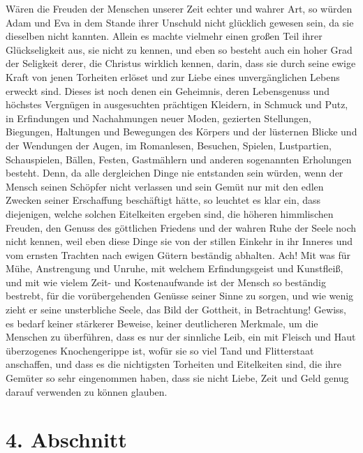 Wären die Freuden der Menschen unserer Zeit echter und wahrer Art, so würden
Adam und Eva in dem Stande ihrer
Unschuld nicht glücklich gewesen sein, da sie
dieselben nicht kannten. Allein es machte vielmehr einen großen Teil ihrer
Glückseligkeit aus, sie nicht zu kennen, und eben so besteht auch ein hoher
Grad der Seligkeit derer, die Christus wirklich kennen, darin, dass sie durch
seine ewige Kraft von jenen Torheiten erlöset und zur Liebe eines
unvergänglichen Lebens erweckt sind. Dieses ist noch denen ein Geheimnis, deren
Lebensgenuss und höchstes Vergnügen in ausgesuchten prächtigen Kleidern, in
Schmuck und Putz, in Erfindungen und
Nachahmungen neuer Moden, gezierten
Stellungen, Biegungen, Haltungen und Bewegungen des Körpers und der lüsternen
Blicke und der Wendungen der Augen, im Romanlesen, Besuchen,
Spielen,
Lustpartien, Schauspielen, Bällen,
Festen, Gastmählern und anderen sogenannten
Erholungen besteht. Denn, da alle dergleichen Dinge nie entstanden sein würden,
wenn der Mensch seinen Schöpfer nicht verlassen und sein Gemüt nur mit den
edlen Zwecken seiner Erschaffung beschäftigt hätte, so leuchtet es klar ein,
dass
diejenigen, welche solchen Eitelkeiten ergeben sind, die höheren himmlischen
Freuden, den Genuss des göttlichen Friedens und der wahren Ruhe der Seele noch
nicht kennen, weil eben diese Dinge sie von der stillen Einkehr in ihr Inneres
und vom ernsten Trachten nach ewigen Gütern beständig abhalten. Ach! Mit was für
Mühe, Anstrengung und Unruhe, mit welchem Erfindungsgeist und Kunstfleiß, und
mit wie vielem Zeit- und Kostenaufwande ist der Mensch so beständig bestrebt,
für die vorübergehenden Genüsse seiner Sinne zu sorgen, und wie wenig zieht er
seine unsterbliche Seele, das Bild der Gottheit, in Betrachtung! Gewiss, es
bedarf keiner stärkerer Beweise, keiner deutlicheren Merkmale, um die Menschen
zu
überführen, dass es nur der sinnliche Leib, ein mit Fleisch und Haut überzogenes
Knochengerippe ist, wofür sie so viel Tand und
Flitterstaat anschaffen, und dass
es die nichtigsten Torheiten und Eitelkeiten sind, die ihre Gemüter so sehr
eingenommen haben, dass sie nicht Liebe, Zeit und Geld genug darauf
verwenden zu können glauben.

\section{4. Abschnitt} \label{kap17_ab4}

